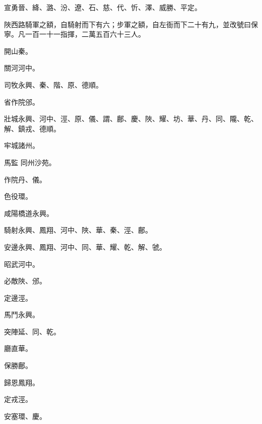 \begin{pinyinscope}
 宣勇晉、絳、潞、汾、遼、石、慈、代、忻、澤、威勝、平定。



 陜西路騎軍之額，自騎射而下有六；步軍之額，自左衙而下二十有九，並改號曰保寧。凡一百一十一指揮，二萬五百六十三人。



 開山秦。



 關河河中。



 司牧永興、秦、階、原、德順。



 省作院邠。



 壯城永興、河中、涇、原、儀、謂、鄜、慶、陜、耀、坊、華、丹、同、隴、乾、解、鎮戎、德順。



 牢城諸州。



 馬監
 同州沙苑。



 作院丹、儀。



 色役環。



 咸陽橋道永興。



 騎射永興、鳳翔、河中、陜、華、秦、涇、鄜。



 安邊永興、鳳翔、河中、同、華、耀、乾、解、虢。



 昭武河中。



 必敵陜、邠。



 定邊涇。



 馬鬥永興。



 突陣延、同、乾。



 廳直華。



 保勝鄜。



 歸恩鳳翔。



 定戎涇。



 安塞環、慶。




\end{pinyinscope}
